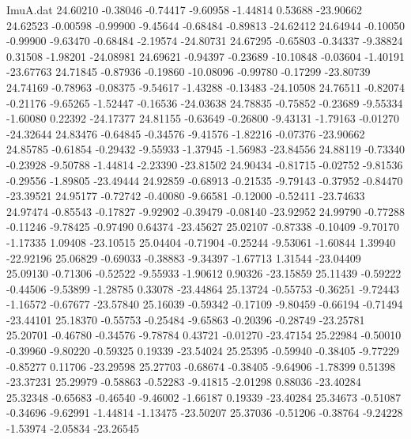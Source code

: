 \begin{filecontents}{ImuA.dat}
  24.60210   -0.38046   -0.74417   -9.60958   -1.44814    0.53688  -23.90662
  24.62523   -0.00598   -0.99900   -9.45644   -0.68484   -0.89813  -24.62412
  24.64944   -0.10050   -0.99900   -9.63470   -0.68484   -2.19574  -24.80731
  24.67295   -0.65803   -0.34337   -9.38824    0.31508   -1.98201  -24.08981
  24.69621   -0.94397   -0.23689  -10.10848   -0.03604   -1.40191  -23.67763
  24.71845   -0.87936   -0.19860  -10.08096   -0.99780   -0.17299  -23.80739
  24.74169   -0.78963   -0.08375   -9.54617   -1.43288   -0.13483  -24.10508
  24.76511   -0.82074   -0.21176   -9.65265   -1.52447   -0.16536  -24.03638
  24.78835   -0.75852   -0.23689   -9.55334   -1.60080    0.22392  -24.17377
  24.81155   -0.63649   -0.26800   -9.43131   -1.79163   -0.01270  -24.32644
  24.83476   -0.64845   -0.34576   -9.41576   -1.82216   -0.07376  -23.90662
  24.85785   -0.61854   -0.29432   -9.55933   -1.37945   -1.56983  -23.84556
  24.88119   -0.73340   -0.23928   -9.50788   -1.44814   -2.23390  -23.81502
  24.90434   -0.81715   -0.02752   -9.81536   -0.29556   -1.89805  -23.49444
  24.92859   -0.68913   -0.21535   -9.79143   -0.37952   -0.84470  -23.39521
  24.95177   -0.72742   -0.40080   -9.66581   -0.12000   -0.52411  -23.74633
  24.97474   -0.85543   -0.17827   -9.92902   -0.39479   -0.08140  -23.92952
  24.99790   -0.77288   -0.11246   -9.78425   -0.97490    0.64374  -23.45627
  25.02107   -0.87338   -0.10409   -9.70170   -1.17335    1.09408  -23.10515
  25.04404   -0.71904   -0.25244   -9.53061   -1.60844    1.39940  -22.92196
  25.06829   -0.69033   -0.38883   -9.34397   -1.67713    1.31544  -23.04409
  25.09130   -0.71306   -0.52522   -9.55933   -1.90612    0.90326  -23.15859
  25.11439   -0.59222   -0.44506   -9.53899   -1.28785    0.33078  -23.44864
  25.13724   -0.55753   -0.36251   -9.72443   -1.16572   -0.67677  -23.57840
  25.16039   -0.59342   -0.17109   -9.80459   -0.66194   -0.71494  -23.44101
  25.18370   -0.55753   -0.25484   -9.65863   -0.20396   -0.28749  -23.25781
  25.20701   -0.46780   -0.34576   -9.78784    0.43721   -0.01270  -23.47154
  25.22984   -0.50010   -0.39960   -9.80220   -0.59325    0.19339  -23.54024
  25.25395   -0.59940   -0.38405   -9.77229   -0.85277    0.11706  -23.29598
  25.27703   -0.68674   -0.38405   -9.64906   -1.78399    0.51398  -23.37231
  25.29979   -0.58863   -0.52283   -9.41815   -2.01298    0.88036  -23.40284
  25.32348   -0.65683   -0.46540   -9.46002   -1.66187    0.19339  -23.40284
  25.34673   -0.51087   -0.34696   -9.62991   -1.44814   -1.13475  -23.50207
  25.37036   -0.51206   -0.38764   -9.24228   -1.53974   -2.05834  -23.26545

\end{filecontents}
